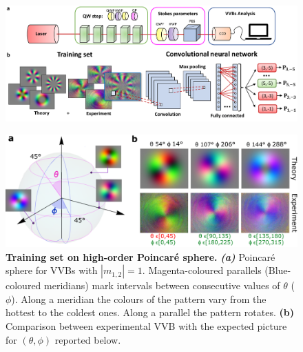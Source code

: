 \begin{figure}
	\centering
	\includegraphics[width=\textwidth]{Figures/quantum-walks/VVBs-schema.pdf}
\end{figure}

\begin{figure}
	\centering
	\includegraphics[width=\textwidth]{Figures/quantum-walks/VVBs-results_th_ph_old.pdf}
	\caption{
		\textbf{Training set on high-order Poincar\'e sphere.}
		\textbf{\emph{(a)}} Poincar\'e sphere for \acp{VVB} with $|m_{1,2}|=1$.
		Magenta-coloured parallels (Blue-coloured meridians) mark intervals between consecutive values of $\theta$ ($\phi$). 
	    Along a meridian the colours of the pattern vary from the hottest to the coldest ones. Along a parallel the pattern rotates. 
	    \textbf{(b)} Comparison between experimental \ac{VVB} with the expected picture for $(\theta, \phi)$ reported below.
	}
\end{figure}


